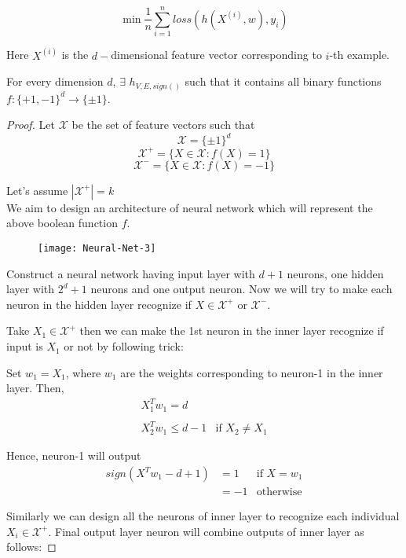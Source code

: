 \documentclass[12pt]{report}
\begin{document}
$$\min \frac{1}{n} \sum_{i=1}^{n} loss\left(h(X^{(i)}, w), y_{i}\right)$$  

Here $X^{(i)}$ is the $d-$dimensional feature vector corresponding to $i$-th example.

\begin{theorem}
\label{Thm1}
For every dimension $d$,   $\exists$ $h_{V,E, sign()}$ such that it contains all binary functions $f : \{+1, -1\}^{d} \rightarrow \{\pm 1\}$.
\end{theorem}

\begin{proof}
Let $\mathcal{X}$ be the set of feature vectors such that
$$\mathcal{X} = \{\pm 1\}^{d}$$ 
$$\mathcal{X}^{+} = \{ X \in \mathcal{X} : f(X)  = 1\}$$
$$\mathcal{X}^{-} = \{ X \in \mathcal{X} : f(X)  = -1\}$$

Let's assume $|\mathcal{X^{+}}| = k$\\
We aim to design an architecture of neural network which will represent the above boolean function $f$.

\begin{figure}[H]
\centering
\texttt{[image: Neural-Net-3]}
\caption{}
\label{fig:Neural-Net-3}
\end{figure}

Construct a neural network having input layer with $d+1$ neurons, one hidden layer with $2^{d} + 1$ neurons and one output neuron. Now we will try to make each neuron in the hidden layer recognize if $X \in \mathcal{X^{+}}$ or $\mathcal{X^{-}}$.

Take $X_{1} \in \mathcal{X}^{+}$ then we can make the 1st neuron in the inner layer recognize if input is $X_{1}$ or not by following trick:

Set $w_{1} = X_{1}$, where $w_{1}$ are the weights corresponding to neuron-1 in the inner layer. Then,
\[
\begin{array}{lr}
	X_{1}^{T}w_{1} = d & \\
	\\
X_{2}^{T}w_{1} \leq d - 1 & \text{if } X_{2} \neq X_{1}
\end{array}
\]

Hence, neuron-1 will output
\[
\begin{array}{llr}
	sign\left(X^{T}w_{1} - d + 1\right) & = 1 & \text{if } X = w_{1}\\
	 &  = -1 & \text{otherwise}
\end{array}
\]

Similarly we can design all the neurons of inner layer to recognize each individual $X_{i} \in \mathcal{X}^{+}$. Final output layer neuron will combine outputs of inner layer as follows:


\end{proof}
\end{document}
